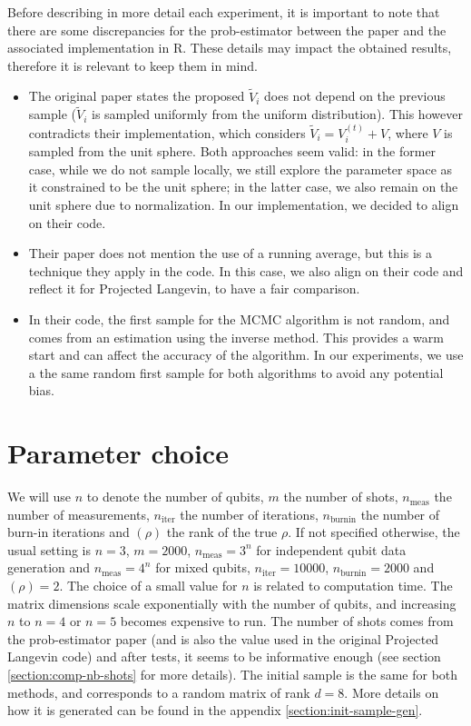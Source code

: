 \documentclass[12pt]{memoir}
\newcommand{\nmeasn}[1]{$n_{\text{meas}}=#1$}
\newcommand{\nitern}[1]{$n_{\text{iter}}=#1$}
\newcommand{\nburninn}[1]{$n_{\text{burnin}}=#1$}
\newcommand{\rhorankn}[1]{\text{rank}$(\rho)=#1$}
\newcommand{\nmeas}[0]{$n_{\text{meas}} $ }
\newcommand{\niter}[0]{$n_{\text{iter}} $ }
\newcommand{\nburnin}[0]{$n_{\text{burnin}} $ }
\newcommand{\rhorank}[0]{\text{rank}$(\rho) $ }
\begin{document}
Before describing in more detail each experiment, it is important to note that there are some discrepancies for the prob-estimator between the paper and the associated implementation in R. These details may impact the obtained results, therefore it is relevant to keep them in mind.
\begin{itemize}
\item The original paper states the proposed $\tilde V_i$ does not depend on the previous sample ($\tilde V_i$ is sampled uniformly from the uniform distribution). This however contradicts their implementation, which considers $\tilde V_i = V_i^{(t)} + V$, where $V$ is sampled from the unit sphere. Both approaches seem valid: in the former case, while we do not sample locally, we still explore the parameter space as it constrained to be the unit sphere; in the latter case, we also remain on the unit sphere due to normalization. In our implementation, we decided to align on their code.
\item Their paper does not mention the use of a running average, but this is a technique they apply in the code. In this case, we also align on their code and reflect it for Projected Langevin, to have a fair comparison.
\item In their code, the first sample for the MCMC algorithm is not random, and comes from an estimation using the inverse method. This provides a warm start and can affect the accuracy of the algorithm. In our experiments, we use a the same random first sample for both algorithms to avoid any potential bias. 
\end{itemize}


\section{Parameter choice}
We will use $n$ to denote the number of qubits, $m$ the number of shots, \nmeas the number of measurements, \niter the number of iterations, \nburnin the number of burn-in iterations and \rhorank the rank of the true $\rho$. If not specified otherwise, the usual setting is $n=3$, $m=2000$, \nmeasn{3^n} for independent qubit data generation and \nmeasn{4^n} for mixed qubits, \nitern{10000}, \nburninn{2000} and \rhorankn{2}. The choice of a small value for $n$ is related to computation time. The matrix dimensions scale exponentially with the number of qubits, and increasing $n$ to $n=4$ or $n=5$ becomes expensive to run. The number of shots comes from the prob-estimator paper (and is also the value used in the original Projected Langevin code) and after tests, it seems to be informative enough (see section \ref{section:comp-nb-shots} for more details). The initial sample is the same for both methods, and corresponds to a random matrix of rank $d=8$. More details on how it is generated can be found in the appendix \ref{section:init-sample-gen}.\medbreak
\end{document}
